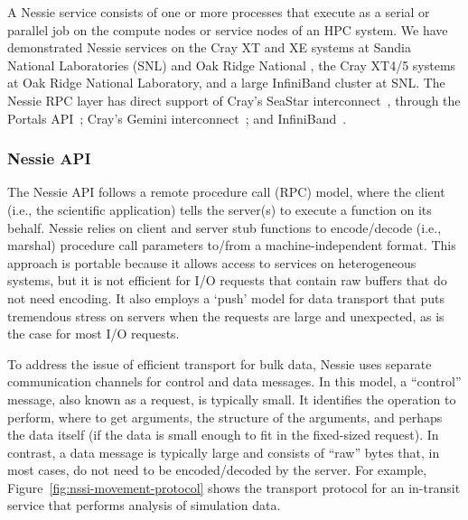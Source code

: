 A Nessie service consists of one or more processes that execute as a serial
or parallel job on the compute nodes or service nodes of an HPC system. We have
demonstrated Nessie services on the Cray XT and XE systems at Sandia National
Laboratories (SNL) and Oak Ridge National , the Cray XT4/5 systems at Oak Ridge National Laboratory,
and a large InfiniBand
cluster at SNL. The Nessie RPC layer has direct support of Cray's SeaStar
interconnect~\cite{brightwell:2006:seastar}, through the Portals
API~\cite{brightwell:2002:portals3}; Cray's Gemini
interconnect~\cite{alverson:2010:gemini}; and
InfiniBand~\cite{infiniband:specification}.  

\subsubsection{Nessie API}

The Nessie API follows a remote procedure call (RPC) model, where the client
(i.e., the scientific application) tells the server(s) to execute a function on
its behalf.  Nessie relies on client and server stub functions to encode/decode
(i.e., marshal) procedure call parameters to/from a machine-independent format.
This approach is portable because it allows access to services on heterogeneous
systems, but it is not efficient for I/O requests that contain raw buffers that
do not need encoding. It also employs a `push' model for data transport that
puts tremendous stress on servers when the requests are large and unexpected,
as is the case for most I/O requests.


To address the issue of efficient transport for bulk data, Nessie uses separate
communication channels for control and data messages. In this model, a ``control''
message, also known as a request, is typically small. It identifies the
operation to perform, where to get arguments, the structure of the arguments,
and perhaps the data itself (if the data is small enough to fit in the
fixed-sized request).  In contrast, a data message is typically large and
consists of ``raw'' bytes that, in most cases, do not need to be
encoded/decoded by the server. For example,
Figure~\ref{fig:nssi-movement-protocol} shows the transport protocol for an
in-transit service that performs analysis of simulation data.

